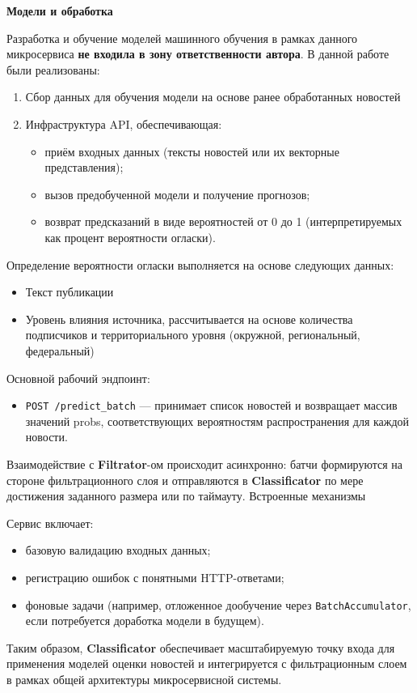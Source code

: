 \textbf{Модели и обработка}

Разработка и обучение моделей машинного обучения в рамках данного микросервиса \textbf{не входила в зону ответственности автора}.
В данной работе были реализованы:
\begin{enumerate}
    \item Сбор данных для обучения модели на основе ранее обработанных новостей
    \item Инфраструктура API, обеспечивающая:
    \begin{itemize}
        \item приём входных данных (тексты новостей или их векторные представления);
        \item вызов предобученной модели и получение прогнозов;
        \item возврат предсказаний в виде вероятностей от 0 до 1 (интерпретируемых как процент вероятности огласки).
    \end{itemize}
\end{enumerate}

Определение вероятности огласки выполняется на основе следующих данных:
\begin{itemize}
    \item Текст публикации
    \item Уровень влияния источника, рассчитывается на основе количества подписчиков и территориального уровня (окружной,  региональный, федеральный)
\end{itemize}

Основной рабочий эндпоинт:
\begin{itemize}
    \item \texttt{POST /predict\_batch} — принимает список новостей и возвращает массив значений probs, соответствующих вероятностям распространения для каждой новости.
\end{itemize}

Взаимодействие с \textbf{Filtrator}-ом происходит асинхронно: батчи формируются на стороне фильтрационного слоя и отправляются в \textbf{Classificator} по мере достижения заданного размера или по таймауту.
Встроенные механизмы

Сервис включает:
\begin{itemize}
    \item базовую валидацию входных данных;
    \item регистрацию ошибок с понятными HTTP-ответами;
    \item фоновые задачи (например, отложенное дообучение через \texttt{BatchAccumulator}, если потребуется доработка модели в будущем).
\end{itemize}

Таким образом, \textbf{Classificator} обеспечивает масштабируемую точку входа для применения моделей оценки новостей и интегрируется с фильтрационным слоем в рамках общей архитектуры микросервисной системы.
